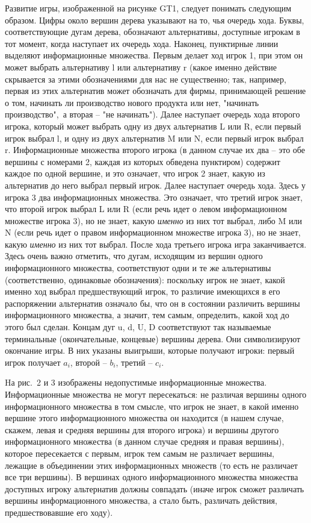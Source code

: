 \documentclass[12pt]{article}
\begin{document}
Развитие игры, изображенной на рисунке GT1, следует понимать следующим
образом. Цифры около вершин дерева указывают на то, чья очередь хода.
Буквы, соответствующие дугам дерева, обозначают альтернативы, доступные
игрокам в тот момент, когда наступает их очередь хода. Наконец,
пунктирные линии выделяют информационные множества. Первым делает ход
игрок 1, при этом он может выбрать альтернативу
l или альтернативу r (какое именно действие скрывается за этими обозначениями
для нас не существенно; так, например, первая из этих альтернатив может
обозначать для фирмы, принимающей решение о том, начинать ли производство
нового продукта или нет, "начинать производство",\, а вторая -- "не начинать").
Далее наступает очередь хода второго игрока, который может выбрать
одну из двух альтернатив L или R, если первый игрок выбрал l, и одну из двух
альтернатив M или N, если первый игрок выбрал r. Информационные множества
второго игрока (в данном случае их два -- это обе вершины с номерами 2,
каждая из которых обведена пунктиром) содержит каждое по одной вершине,
и это означает, что игрок 2 знает, какую из альтернатив до него выбрал
первый игрок. Далее наступает очередь хода. Здесь у игрока 3 два
информационных множества. Это означает, что третий игрок знает, что второй
игрок выбрал L или R (если речь идет о левом информационном множестве
игрока 3), но не знает, какую \emph{именно} из них тот выбрал, либо M или
N (если речь идет о правом информационном множестве
игрока 3), но не знает, какую \emph{именно} из них тот выбрал. После хода
третьего игрока игра заканчивается. Здесь очень важно отметить, что
дугам, исходящим из вершин одного информационного множества, соответствуют
одни и те же альтернативы (соответственно, одинаковые обозначения):
поскольку игрок не знает, какой именно ход выбрал предшествующий игрок, то
различие имеющихся в его распоряжении альтернатив означало бы, что он
в состоянии различить вершины информационного множества, а значит, тем самым,
определить, какой ход до этого был сделан. Концам дуг u, d, U, D соответствуют
так называемые терминальные (окончательные, концевые) вершины дерева.
Они символизируют окончание игры. В них указаны выигрыши, которые получают
игроки: первый игрок получает $a_i$, второй -- $b_i$, третий -- $c_i$.


Hа рис.~2 и 3 изображены недопустимые информационные множества.
Информационные множества не могут пересекаться: не различая вершины
одного информационного множества в том смысле, что игрок не знает,
в какой именно вершине этого информационного множества он находится
(в нашем случае, скажем, левая и средняя вершины для второго игрока)
и вершины другого информационного множества
(в данном случае средняя и правая вершины), которое пересекается с первым,
игрок тем самым не различает вершины, лежащие в объединении этих информационных
множеств (то есть не различает все три вершины). В вершинах одного
информационного множества множества
доступных игроку альтернатив должны совпадать (иначе игрок сможет
различать вершины информационного множества, а стало быть, различать
действия, предшествовавшие его ходу).
\end{document}
